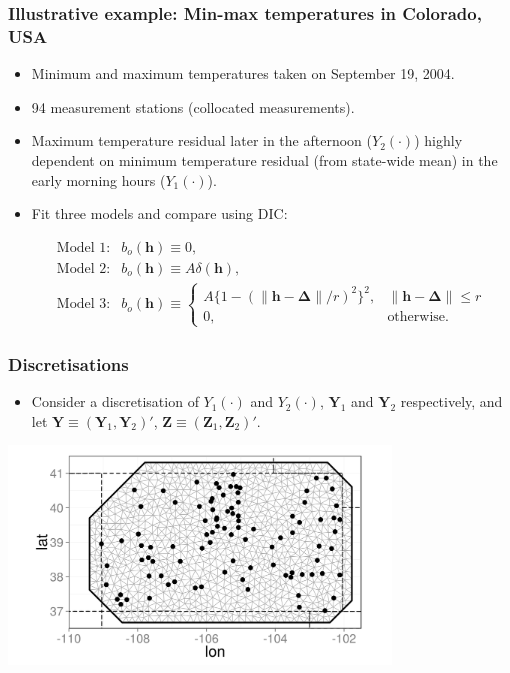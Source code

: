 \documentclass{beamer}
\newcommand{\Deltab} {\boldsymbol{\Delta}}
\newcommand{\h}{\mathbf{h}}
\newcommand{\Yvec}{\mathbf{Y}}
\newcommand{\Zvec}{\mathbf{Z}}
\begin{document}
\begin{frame}
\frametitle{Illustrative example: Min-max temperatures in Colorado, USA}

\begin{itemize}
\item Minimum and maximum temperatures taken on September 19, 2004.
\item 94 measurement stations (collocated measurements).
\item Maximum temperature residual later in the afternoon ($Y_2(\cdot)$) highly dependent on minimum temperature residual (from state-wide mean) in the early morning hours ($Y_1(\cdot)$).
\item Fit three models and compare using DIC:

\begin{equation*}
\begin{array}{ll}
\textrm{Model 1:} &b_o(\h) \equiv 0, \\
\textrm{Model 2:} &b_o(\h) \equiv A\delta(\h), \\
\textrm{Model 3:} &b_o(\h) \equiv \left\{\begin{array}{ll} A\{1 - (\|\h - \Deltab\|/r)^2\}^2, & \| \h - \Deltab\| \le r \\ 0, & \textrm{otherwise}. \end{array} \right. 
\end{array}
\end{equation*}
\end{itemize}
\end{frame}


\begin{frame}
\frametitle{Discretisations}
\begin{itemize}
\item Consider a discretisation of $Y_1(\cdot)$ and $Y_2(\cdot)$, $\Yvec_1$ and $\Yvec_2$ respectively, and let $\Yvec \equiv (\Yvec_1,\Yvec_2)'$, $\Zvec \equiv (\Zvec_1,\Zvec_2)'$.
\end{itemize}

\vspace{-0.1in}
\begin{center}
\includegraphics[width=4in]{meshplot.png}
\end{center}

\end{frame}
\end{document}
